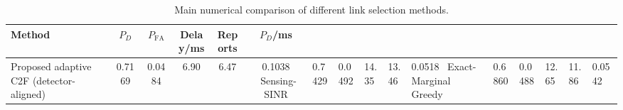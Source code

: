 \begin{table}[t]
    \centering
    \caption{Main numerical comparison of different link selection methods.}
    \label{tab:main_summary}
    \begin{tabular}{l c c c c c}
        \hline
        Method & $P_D$ & $P_{\mathrm{FA}}$ & Delay/ms & Reports & $P_D$/ms \\
        \hline
        Proposed adaptive C2F (detector-aligned) & 0.7169 & 0.0484 & 6.90 & 6.47 & 0.1038 \
        Sensing-SINR & 0.7429 & 0.0492 & 14.35 & 13.46 & 0.0518 \
        Exact-Marginal Greedy & 0.6860 & 0.0488 & 12.65 & 11.86 & 0.0542 \
        \hline
    \end{tabular}
\end{table}
